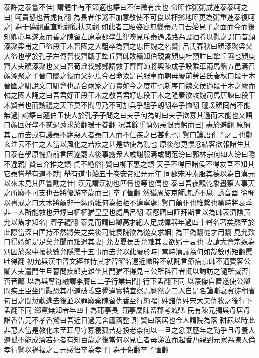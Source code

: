 泰許之泰嘗不佳|{
	謂體中有不節適也語曰不佳微有疾也}
命昭作粥粥成進泰泰呵之曰|{
	呵責怒也音虎何翻}
為長者作粥不加意敬使不可食以杯擲地昭更為粥重進泰復呵之|{
	為于偽翻重直龍翻復扶又翻}
如此者三昭姿容無變泰乃曰吾始見子之面而今而後知卿心耳遂友而善之陳留左原為郡學生犯灋見斥泰遇諸路為設酒肴以慰之謂曰昔顔涿聚梁甫之巨盜段干木晉國之大駔卒為齊之忠臣魏之名賢|{
	呂氏春秋曰顔涿聚梁父大盜也學於孔子左傳晉伐齊戰于犂丘齊師敗績知伯親禽顔庚杜預註曰犂丘隰也顔庚齊大夫顔涿聚也又曰晉荀瑶伐鄭鄭請救于齊齊師將興陳成子設乘車兩馬繫五邑焉召顔涿聚之子晉曰隰之役而父死焉今君命汝是邑服車而朝毋廢前勞呂氏春秋曰段干木晉國之駔說文曰駔會也謂合兩家之買賣如今之度市也新序曰魏文侯過段干木之廬而軾之國人誦之曰吾君好正段干木之敬吾君好忠段干木之隆秦欲攻魏司馬唐諫曰段干木賢者也而魏禮之天下莫不聞毋乃不可加兵乎駔子朗翻卒子恤翻}
蘧瑗顔囘尚不能無過|{
	論語曰蘧伯玉使人於孔子子問之曰夫子何為對曰夫子欲寡其過而未能也又語曰顔回好學不貳過蘧求於翻瑗于眷翻}
况其餘乎慎勿恚恨責躬而已|{
	恚於避翻}
原納其言而去或有譏泰不絶惡人者泰曰人而不仁疾之已甚亂也|{
	賢曰論語孔子之言也鄭玄注云不仁之人當以風化之若疾之甚是益使為亂也}
原後忽更懷忿結客欲報諸生其日泰在學原愧負前言因遂罷去後事露衆人咸謝服焉或問范滂曰郭林宗何如人滂曰隱不違親|{
	賢曰介推之類}
貞不絶俗|{
	賢曰柳下惠之類}
天子不得臣諸侯不得友吾不知其它泰嘗舉有道不就|{
	舉有道事始五十卷安帝建光元年}
同郡宋冲素服其德以為自漢元以來未見其匹嘗勸之仕|{
	漢元謂漢初也匹儔也等也偶也}
泰曰吾夜觀乾象晝察人事天之所廢不可支也吾將優游卒歲而已|{
	卒子恤翻}
然猶周旋京師誨誘不息|{
	誘音酉}
徐穉以書戒之曰大木將顛非一繩所維何為栖栖不遑寧處|{
	賢曰顛仆也維繫也喻時將衰季非一人所能救也尹焞曰栖栖猶皇皇也處昌呂翻}
泰感寤曰謹拜斯言以為師表濟隂黄允以雋才知名|{
	濟子禮翻}
泰見而謂曰卿高才絶人足成偉器年過四十聲名著矣然至於此際當深自匡持不然將失之矣後司徒袁隗欲為從女求姻|{
	為干偽翻從才用翻}
見允歎曰得婿如是足矣允聞而黜遣其妻|{
	允妻夏侯氏允黜其妻欲婿于袁也}
妻請大會宗親為别因於衆中攘袂數允隱慝十五事而去允以此廢於時|{
	當時清議為何如哉數所矩翻慝吐得翻}
初允與漢中晉文經並恃其才智曜名遠近徵辟不就託言療病京師不通賓客公卿大夫遣門生旦暮問疾郎吏雜坐其門猶不得見三公所辟召者輒以詢訪之隨所臧否|{
	否音鄙}
以為與奪符融謂李膺曰二子行業無聞|{
	行下孟翻下同}
以豪傑自置遂使公卿問疾王臣坐門融恐其小道破義空譽違實特宜察焉膺然之二人自是名論漸衰賓徒稍省旬日之間慙歎逃去後並以罪廢棄陳留仇香至行純嘿|{
	姓譜仇姓宋大夫仇牧之後行下孟翻下同}
鄉黨無知者年四十為蒲亭長|{
	蒲亭屬陳留郡考城縣}
民有陳元獨與母居母詣香告元不孝香驚曰吾近日過元舍廬落整頓|{
	賢曰落居也今人謂院為落}
耕耘以時此非惡人當是教化未至耳母守寡養孤苦身投老柰何以一旦之忿棄歷年之勤乎且母養人遺孤不能成濟若死者有知百歲之後當何以見亡者母涕泣而起香乃親到元家為陳人倫孝行譬以禍福之言元感悟卒為孝子|{
	為于偽翻卒子恤翻}
